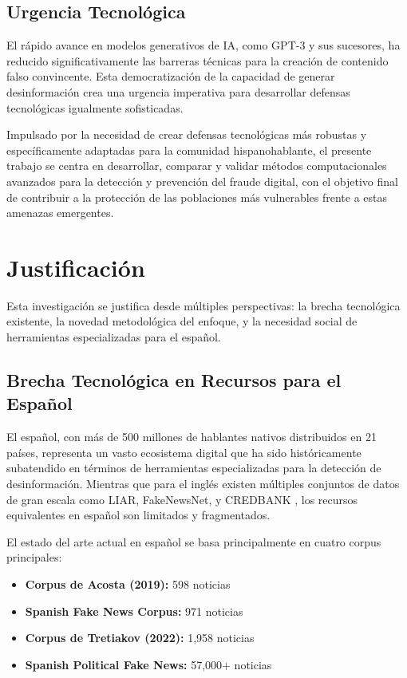 \subsection{Urgencia Tecnológica}

El rápido avance en modelos generativos de IA, como GPT-3 \cite{brown2020language} y sus sucesores, ha reducido significativamente las barreras técnicas para la creación de contenido falso convincente. Esta democratización de la capacidad de generar desinformación \cite{su2023fake} crea una urgencia imperativa para desarrollar defensas tecnológicas igualmente sofisticadas.

Impulsado por la necesidad de crear defensas tecnológicas más robustas y específicamente adaptadas para la comunidad hispanohablante, el presente trabajo se centra en desarrollar, comparar y validar métodos computacionales avanzados para la detección y prevención del fraude digital, con el objetivo final de contribuir a la protección de las poblaciones más vulnerables frente a estas amenazas emergentes.

\section{Justificación}

Esta investigación se justifica desde múltiples perspectivas: la brecha tecnológica existente, la novedad metodológica del enfoque, y la necesidad social de herramientas especializadas para el español.

\subsection{Brecha Tecnológica en Recursos para el Español}

El español, con más de 500 millones de hablantes nativos distribuidos en 21 países, representa un vasto ecosistema digital que ha sido históricamente subatendido en términos de herramientas especializadas para la detección de desinformación. Mientras que para el inglés existen múltiples conjuntos de datos de gran escala como LIAR, FakeNewsNet, y CREDBANK \cite{hu2022deep}, los recursos equivalentes en español son limitados y fragmentados.

El estado del arte actual en español se basa principalmente en cuatro corpus principales:
\begin{itemize}
    \item \textbf{Corpus de Acosta (2019):} 598 noticias \cite{acosta2019construccion}
    \item \textbf{Spanish Fake News Corpus:} 971 noticias \cite{posadas2019detection}
    \item \textbf{Corpus de Tretiakov (2022):} 1,958 noticias \cite{tretiakov2022detection}
    \item \textbf{Spanish Political Fake News:} 57,000+ noticias \cite{blanco2024enhancing}
\end{itemize}

